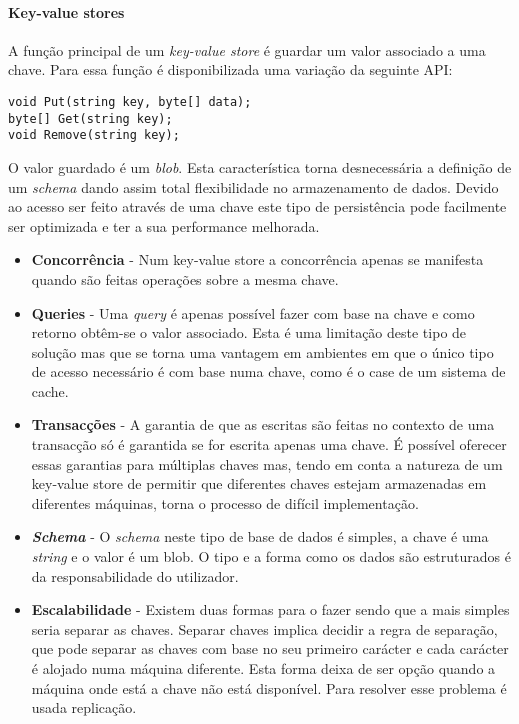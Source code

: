 \documentclass[]{article}
\begin{document}
\paragraph{Key-value stores}
A função principal de um \emph{key-value store} é guardar um valor associado a uma chave. Para essa função é disponibilizada uma variação da seguinte API:
\begin{verbatim}
void Put(string key, byte[] data);
byte[] Get(string key);
void Remove(string key);
\end{verbatim}
O valor guardado é um \emph{blob}. Esta característica torna desnecessária a definição de um \emph{schema} dando assim total flexibilidade no armazenamento de dados. Devido ao acesso ser feito através de uma chave este tipo de persistência pode facilmente ser optimizada e ter a sua performance melhorada.
\begin{itemize}
\item
\textbf{Concorrência} - Num key-value store a concorrência apenas se manifesta quando são feitas operações sobre a mesma chave.
\item
\textbf{Queries} - Uma \emph{query} é apenas possível fazer com base na chave e como retorno obtêm-se o valor associado. Esta é uma limitação deste tipo de solução mas que se torna uma vantagem em ambientes em que o único tipo de acesso necessário é com base numa chave, como é o case de um sistema de cache.
\item
\textbf{Transacções} - A garantia de que as escritas são feitas no contexto de uma transacção só é garantida se for escrita apenas uma chave. É possível oferecer essas garantias para múltiplas chaves mas, tendo em conta a natureza de um key-value store de permitir que diferentes chaves estejam armazenadas em diferentes máquinas, torna o processo de difícil implementação.
\item
\textbf{\emph{Schema}} - O \emph{schema} neste tipo de base de dados é simples, a chave é uma \emph{string} e o valor é um blob. O tipo e a forma como os dados são estruturados é da responsabilidade do utilizador.
\item
\textbf{Escalabilidade} - Existem duas formas para o fazer sendo que a mais simples seria separar as chaves. Separar chaves implica decidir a regra de separação, que pode separar as chaves com base no seu primeiro carácter e cada carácter é alojado numa máquina diferente. Esta forma deixa de ser opção quando a máquina onde está a chave não está disponível. Para resolver esse problema é usada replicação.
\end{itemize}
\end{document}
